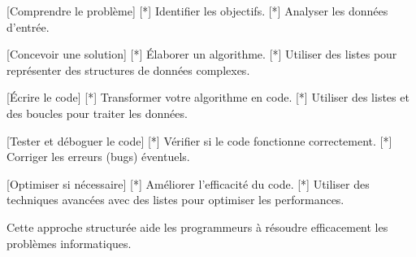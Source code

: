   [Comprendre le problème]
    [*] Identifier les objectifs.
    [*] Analyser les données d'entrée.

  [Concevoir une solution]
    [*] Élaborer un algorithme.
    [*] Utiliser des listes pour représenter des structures de données complexes.

  [Écrire le code]
    [*] Transformer votre algorithme en code.
    [*] Utiliser des listes et des boucles pour traiter les données.

  [Tester et déboguer le code]
    [*] Vérifier si le code fonctionne correctement.
    [*] Corriger les erreurs (bugs) éventuels.

  [Optimiser si nécessaire]
    [*] Améliorer l'efficacité du code.
    [*] Utiliser des techniques avancées avec des listes pour optimiser les performances.

  Cette approche structurée aide les programmeurs à résoudre efficacement les problèmes informatiques.
